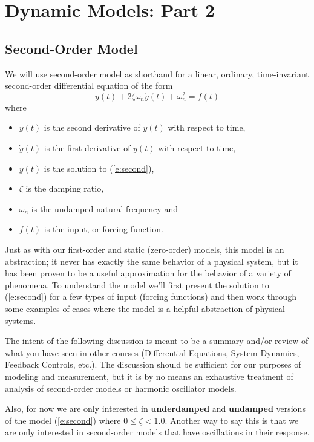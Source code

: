 \chapter{Dynamic Models: Part 2}\label{c:model2}

\section{Second-Order Model}
We will use \gls{second-order model} as shorthand for a linear, ordinary, time-invariant second-order differential equation of the form
\begin{equation} \label{e:second}
\ddot{y}(t) + 2 \zeta \omega_n \dot{y}(t) + \omega_n^2 = f(t)
\end{equation} 
where 
\begin{itemize}
\item $\ddot{y}(t)$ is the second derivative of $y(t)$ with respect to time,
\item $\dot{y}(t)$ is the first derivative of $y(t)$ with respect to time,
\item $y(t)$ is the solution to (\ref{e:second}),
\item $\zeta$ is the \gls{damping ratio},
\item $\omega_n$ is the \gls{undamped natural frequency} and
\item $f(t)$ is the input, or forcing function.
\end{itemize}
Just as with our first-order and static (zero-order) models, this model is an abstraction; it never has exactly the same behavior of a physical system, but it has been proven to be a useful approximation for the behavior of a variety of phenomena.  To understand the model we'll first present the solution to (\ref{e:second}) for a few types of input (forcing functions) and then work through some examples of cases where the model is a helpful abstraction of physical systems.

The intent of the following discussion is meant to be a summary and/or review of what you have seen in other courses (Differential Equations, System Dynamics, Feedback Controls, etc.).  The discussion should be sufficient for our purposes of modeling and measurement, but it is by no means an exhaustive treatment of analysis of second-order models or harmonic oscillator models.

Also, for now we are only interested in {\bf underdamped} and {\bf undamped} versions of the model (\ref{e:second}) where $0 \leq \zeta < 1.0$.  Another way to say this is that we are only interested in second-order models that have oscillations in their response.

